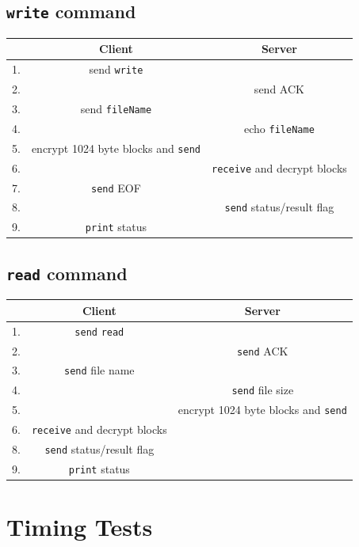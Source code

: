 \documentclass[11pt]{article}
\begin{document}
\subsection*{\texttt{write} command}
\begin{center}
\begin{tabular}{ |c|c|c| } 
 \hline
 ~& Client & Server\\
 \hline\hline
 1. & send \texttt{write} & ~ \\ 
 \hline
 2. & ~ & send {ACK} \\ 
 \hline
 3. & send \texttt{fileName} & ~ \\ 
 \hline
 4. & ~ & echo \texttt{fileName}\\
 \hline
 5. & encrypt 1024 byte blocks and \texttt{send} & ~\\
 \hline
 6. & ~& \texttt{receive} and decrypt blocks\\
 \hline
 7. &\texttt{send} EOF &~\\
 \hline
 8. & ~& \texttt{send} status/result flag\\
 \hline
 9. & \texttt{print} status & ~\\
 \hline
\end{tabular}
\end{center}

\subsection*{\texttt{read} command}
\begin{center}
\begin{tabular}{ |c|c|c| } 
 \hline
 ~& Client & Server\\
 \hline\hline
 1. & \texttt{send} \texttt{read} & ~ \\ 
 \hline
 2. & ~ & \texttt{send} {ACK} \\ 
 \hline
 3. & \texttt{send} file name & ~ \\ 
 \hline
 4. & ~ & \texttt{send} file size\\
 \hline
 5. & ~& encrypt 1024 byte blocks and \texttt{send}\\
 \hline
 6. & \texttt{receive} and decrypt blocks &~\\
 \hline
 8. & \texttt{send} status/result flag &~\\
 \hline
 9. & \texttt{print} status & ~\\
 \hline
\end{tabular}
\end{center}


\section*{Timing Tests}
\end{document}
